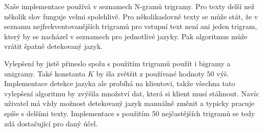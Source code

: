 Naše implementace používá v seznamech N-gramů trigramy. Pro texty delší než několik slov funguje velmi spolehlivě. Pro několikaslovné texty se může stát, že v seznamu nejfrekventovanějších trigramů pro vstupní text není ani jeden trigram, který by se nacházel v seznamech pro jednotlivé jazyky. Pak algoritmus může vrátit špatně detekovaný jazyk.

Vylepšení by jistě přineslo spolu s použitím trigramů použít i bigramy a unigramy. Také konstanta $K$ by šla zvětšit z používané hodnoty $50$ výš. Implementace detekce jazyka ale probíhá na klientovi, takže všechna tato vylepšení algoritmu by zvýšila množství dat, která si klient musí stáhnout. Navíc uživatel má vždy možnost detekovaný jazyk manuálně změnit a typicky pracuje spíše s delšími texty. Implementace s použitím $50$ nejčastějších trigramů se tedy zdá dostačující pro daný účel.